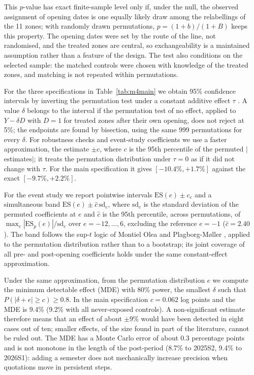 This $p$-value has exact finite-sample level only if, under the null, the observed assignment of opening dates is one equally likely draw among the relabellings of the 11 zones; with randomly drawn permutations, $p=(1+b)/(1+B)$ keeps this property. The opening dates were set by the route of the line, not randomised, and the treated zones are central, so exchangeability is a maintained assumption rather than a feature of the design. The test also conditions on the selected sample: the matched controls were chosen with knowledge of the treated zones, and matching is not repeated within permutations.

For the three specifications in Table~\ref{tab:m4main} we obtain 95\% confidence intervals by inverting the permutation test under a constant additive effect $\tau$ \cite{imbens2015}. A value $\delta$ belongs to the interval if the permutation test of no effect, applied to $Y-\delta D$ with $D=1$ for treated zones after their own opening, does not reject at 5\%; the endpoints are found by bisection, using the same 999 permutations for every $\delta$. For robustness checks and event-study coefficients we use a faster approximation, the estimate $\pm c$, where $c$ is the 95th percentile of the permuted $|$estimates$|$; it treats the permutation distribution under $\tau=0$ as if it did not change with $\tau$. For the main specification it gives $[-10.4\%,+1.7\%]$ against the exact $[-9.7\%,+2.2\%]$.

For the event study we report pointwise intervals $\mathrm{ES}(e)\pm c_e$ and a simultaneous band $\mathrm{ES}(e)\pm\hat c\,\mathrm{sd}_e$, where $\mathrm{sd}_e$ is the standard deviation of the permuted coefficients at $e$ and $\hat c$ is the 95th percentile, across permutations, of $\max_e|\mathrm{ES}_p(e)|/\mathrm{sd}_e$ over $e=-12,\dots,6$, excluding the reference $e=-1$ ($\hat c=2.40$). The band follows the sup-$t$ logic of Montiel Olea and Plagborg-M{\o}ller \cite{montielolea2019}, applied to the permutation distribution rather than to a bootstrap; its joint coverage of all pre- and post-opening coefficients holds under the same constant-effect approximation.

Under the same approximation, from the permutation distribution $e$ we compute the minimum detectable effect (MDE) with 80\% power, the smallest $\delta$ such that $P(|\delta+e|\ge c)\ge0.8$. In the main specification $c=0.062$ log points and the MDE is 9.4\% (9.2\% with all never-exposed controls). A non-significant estimate therefore means that an effect of about $\pm9\%$ would have been detected in eight cases out of ten; smaller effects, of the size found in part of the literature, cannot be ruled out. The MDE has a Monte Carlo error of about 0.3 percentage points and is not monotone in the length of the post-period (8.7\% to 2025S2, 9.4\% to 2026S1): adding a semester does not mechanically increase precision when quotations move in persistent steps.

